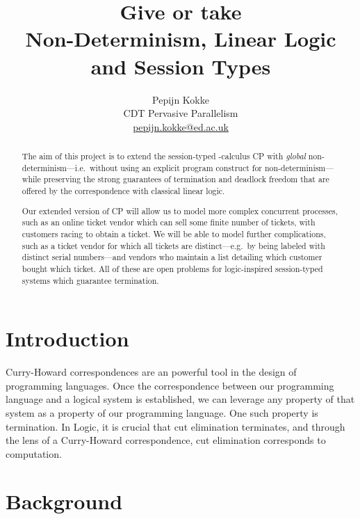 \documentclass[twocolumn]{article}
\title{Give or take \\
  {\large Non-Determinism, Linear Logic and Session Types}}
\author{Pepijn Kokke \\
  CDT Pervasive Parallelism \\
  \url{pepijn.kokke@ed.ac.uk}}
\begin{document}
\maketitle

\begin{abstract}
  The aim of this project is to extend the session-typed \textpi-calculus CP
  \citep{wadler2012} with \emph{global} non-determinism---i.e.\ without using an
  explicit program construct for non-determinism---while preserving the strong
  guarantees of termination and deadlock freedom that are offered by the
  correspondence with classical linear logic. 
  
  Our extended version of CP will allow us to model more complex concurrent
  processes, such as an online ticket vendor which can sell some finite number
  of tickets, with customers racing to obtain a ticket.
  We will be able to model further complications, such as a ticket vendor for
  which all tickets are distinct---e.g.\ by being labeled with distinct serial
  numbers---and vendors who maintain a list detailing which customer bought
  which ticket.
  All of these are open problems for logic-inspired session-typed systems which
  guarantee termination.
\end{abstract}

\section{Introduction}
Curry-Howard correspondences are an powerful tool in the design of programming
languages.
Once the correspondence between our programming language and a logical system is
established, we can leverage any property of that system as a property of our
programming language.
One such property is termination. In Logic, it is crucial that cut elimination
terminates, and through the lens of a Curry-Howard correspondence, cut
elimination corresponds to computation.


\section{Background}
\end{document}
